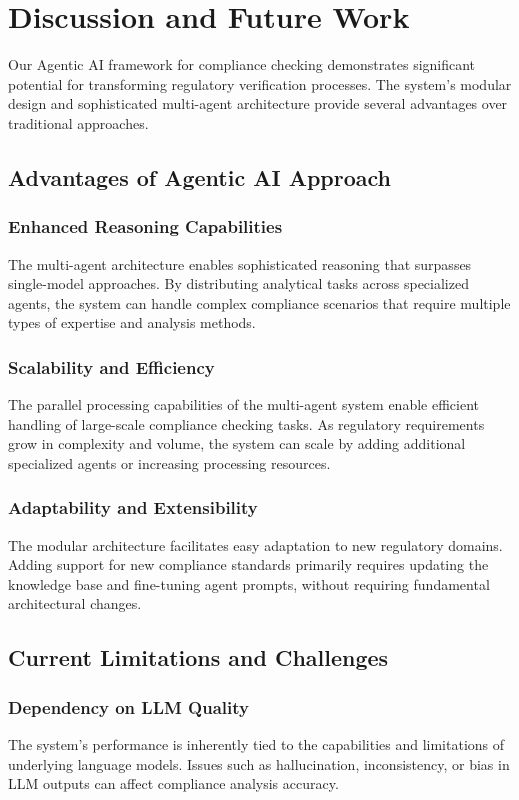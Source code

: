 \documentclass[conference]{IEEEtran}
\begin{document}
\section{Discussion and Future Work}

Our Agentic AI framework for compliance checking demonstrates significant potential for transforming regulatory verification processes. The system's modular design and sophisticated multi-agent architecture provide several advantages over traditional approaches.

\subsection{Advantages of Agentic AI Approach}

\subsubsection{Enhanced Reasoning Capabilities}
The multi-agent architecture enables sophisticated reasoning that surpasses single-model approaches. By distributing analytical tasks across specialized agents, the system can handle complex compliance scenarios that require multiple types of expertise and analysis methods.

\subsubsection{Scalability and Efficiency}
The parallel processing capabilities of the multi-agent system enable efficient handling of large-scale compliance checking tasks. As regulatory requirements grow in complexity and volume, the system can scale by adding additional specialized agents or increasing processing resources.

\subsubsection{Adaptability and Extensibility}
The modular architecture facilitates easy adaptation to new regulatory domains. Adding support for new compliance standards primarily requires updating the knowledge base and fine-tuning agent prompts, without requiring fundamental architectural changes.

\subsection{Current Limitations and Challenges}

\subsubsection{Dependency on LLM Quality}
The system's performance is inherently tied to the capabilities and limitations of underlying language models. Issues such as hallucination, inconsistency, or bias in LLM outputs can affect compliance analysis accuracy.
\end{document}
